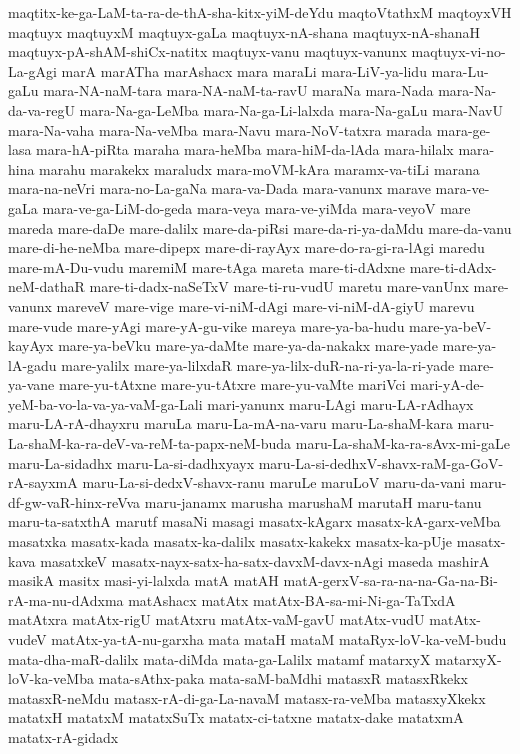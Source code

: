 {maqtitx-ke-ga-LaM-ta-ra-de-thA-sha-kitx-yiM-deYdu
maqtoVtathxM
maqtoyxVH
maqtuyx
maqtuyxM
maqtuyx-gaLa
maqtuyx-nA-shana
maqtuyx-nA-shanaH
maqtuyx-pA-shAM-shiCx-natitx
maqtuyx-vanu
maqtuyx-vanunx
maqtuyx-vi-no-La-gAgi
marA
marATha
marAshacx
mara
maraLi
mara-LiV-ya-lidu
mara-Lu-gaLu
mara-NA-naM-tara
mara-NA-naM-ta-ravU
maraNa
mara-Nada
mara-Na-da-va-regU
mara-Na-ga-LeMba
mara-Na-ga-Li-lalxda
mara-Na-gaLu
mara-NavU
mara-Na-vaha
mara-Na-veMba
mara-Navu
mara-NoV-tatxra
marada
mara-ge-lasa
mara-hA-piRta
maraha
mara-heMba
mara-hiM-da-lAda
mara-hilalx
mara-hina
marahu
marakekx
maraludx
mara-moVM-kAra
maramx-va-tiLi
marana
mara-na-neVri
mara-no-La-gaNa
mara-va-Dada
mara-vanunx
marave
mara-ve-gaLa
mara-ve-ga-LiM-do-geda
mara-veya
mara-ve-yiMda
mara-veyoV
mare
mareda
mare-daDe
mare-dalilx
mare-da-piRsi
mare-da-ri-ya-daMdu
mare-da-vanu
mare-di-he-neMba
mare-dipepx
mare-di-rayAyx
mare-do-ra-gi-ra-lAgi
maredu
mare-mA-Du-vudu
maremiM
mare-tAga
mareta
mare-ti-dAdxne
mare-ti-dAdx-neM-dathaR
mare-ti-dadx-naSeTxV
mare-ti-ru-vudU
maretu
mare-vanUnx
mare-vanunx
mareveV
mare-vige
mare-vi-niM-dAgi
mare-vi-niM-dA-giyU
marevu
mare-vude
mare-yAgi
mare-yA-gu-vike
mareya
mare-ya-ba-hudu
mare-ya-beV-kayAyx
mare-ya-beVku
mare-ya-daMte
mare-ya-da-nakakx
mare-yade
mare-ya-lA-gadu
mare-yalilx
mare-ya-lilxdaR
mare-ya-lilx-duR-na-ri-ya-la-ri-yade
mare-ya-vane
mare-yu-tAtxne
mare-yu-tAtxre
mare-yu-vaMte
mariVci
mari-yA-de-yeM-ba-vo-la-va-ya-vaM-ga-Lali
mari-yanunx
maru-LAgi
maru-LA-rAdhayx
maru-LA-rA-dhayxru
maruLa
maru-La-mA-na-varu
maru-La-shaM-kara
maru-La-shaM-ka-ra-deV-va-reM-ta-papx-neM-buda
maru-La-shaM-ka-ra-sAvx-mi-gaLe
maru-La-sidadhx
maru-La-si-dadhxyayx
maru-La-si-dedhxV-shavx-raM-ga-GoV-rA-sayxmA
maru-La-si-dedxV-shavx-ranu
maruLe
maruLoV
maru-da-vani
maru-df-gw-vaR-hinx-reVva
maru-janamx
marusha
marushaM
marutaH
maru-tanu
maru-ta-satxthA
marutf
masaNi
masagi
masatx-kAgarx
masatx-kA-garx-veMba
masatxka
masatx-kada
masatx-ka-dalilx
masatx-kakekx
masatx-ka-pUje
masatx-kava
masatxkeV
masatx-nayx-satx-ha-satx-davxM-davx-nAgi
maseda
mashirA
masikA
masitx
masi-yi-lalxda
matA
matAH
matA-gerxV-sa-ra-na-na-Ga-na-Bi-rA-ma-nu-dAdxma
matAshacx
matAtx
matAtx-BA-sa-mi-Ni-ga-TaTxdA
matAtxra
matAtx-rigU
matAtxru
matAtx-vaM-gavU
matAtx-vudU
matAtx-vudeV
matAtx-ya-tA-nu-garxha
mata
mataH
mataM
mataRyx-loV-ka-veM-budu
mata-dha-maR-dalilx
mata-diMda
mata-ga-Lalilx
matamf
matarxyX
matarxyX-loV-ka-veMba
mata-sAthx-paka
mata-saM-baMdhi
matasxR
matasxRkekx
matasxR-neMdu
matasx-rA-di-ga-La-navaM
matasx-ra-veMba
matasxyXkekx
matatxH
matatxM
matatxSuTx
matatx-ci-tatxne
matatx-dake
matatxmA
matatx-rA-gidadx
}
